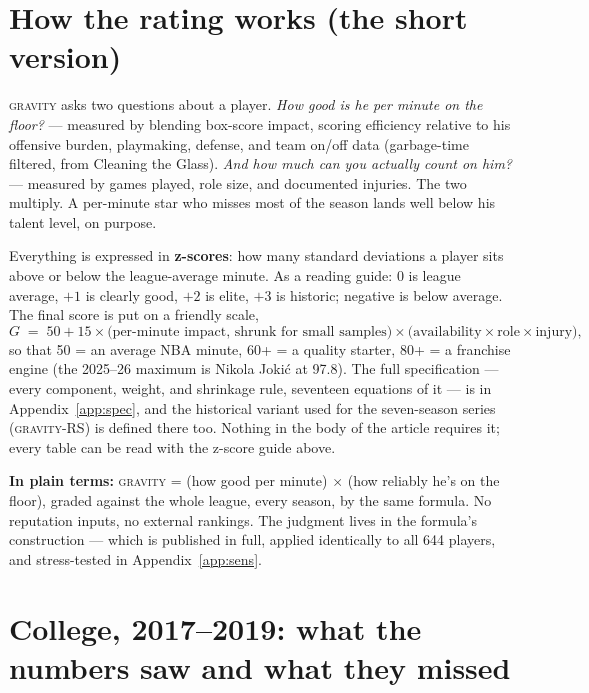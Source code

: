 \documentclass[11pt]{article}
\newcommand{\gravity}{\textsc{gravity}}
\newcommand{\plainbox}[1]{\par\medskip\noindent\begin{center}%
\colorbox{court!8}{\parbox{0.93\textwidth}{\small \textbf{\textcolor{court}{In plain terms:}} #1}}%
\end{center}\medskip}
\begin{document}
\section{How the rating works (the short version)}
\label{sec:short}

\gravity{} asks two questions about a player. \emph{How good is he per minute on the
floor?} --- measured by blending box-score impact, scoring efficiency relative to his
offensive burden, playmaking, defense, and team on/off data (garbage-time filtered, from
Cleaning the Glass). \emph{And how much can you actually count on him?} --- measured by
games played, role size, and documented injuries. The two multiply. A per-minute star who
misses most of the season lands well below his talent level, on purpose.

Everything is expressed in \textbf{z-scores}: how many standard deviations a player sits
above or below the league-average minute. As a reading guide: $0$ is league average,
$+1$ is clearly good, $+2$ is elite, $+3$ is historic; negative is below average. The
final score is put on a friendly scale,
\begin{equation}
G \;=\; 50 + 15 \times \bigl(\text{per-minute impact, shrunk for small samples}\bigr)
\times \bigl(\text{availability} \times \text{role} \times \text{injury}\bigr),
\label{eq:concept}
\end{equation}
so that 50 = an average NBA minute, 60+ = a quality starter, 80+ = a franchise engine
(the 2025--26 maximum is Nikola Joki\'c at 97.8). The full specification --- every
component, weight, and shrinkage rule, seventeen equations of it --- is in
Appendix~\ref{app:spec}, and the historical variant used for the seven-season series
(\gravity-RS) is defined there too. Nothing in the body of the article requires it; every
table can be read with the z-score guide above.

\plainbox{\gravity{} = (how good per minute) $\times$ (how reliably he's on the floor),
graded against the whole league, every season, by the same formula. No reputation
inputs, no external rankings. The judgment lives in the formula's construction --- which
is published in full, applied identically to all 644 players, and stress-tested in
Appendix~\ref{app:sens}.}

\section{College, 2017--2019: what the numbers saw and what they missed}
\label{sec:college}
\end{document}
